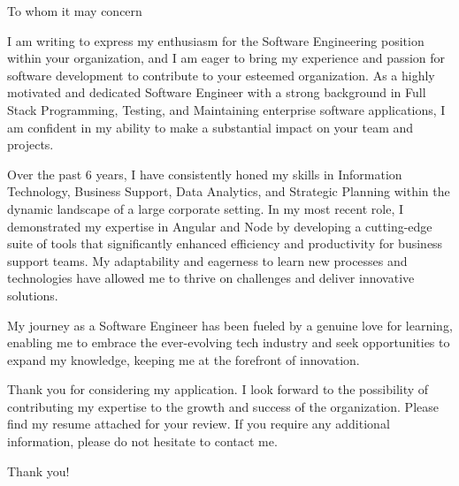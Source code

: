 \documentclass[
parskip=half,
fontsize=11pt, %
twoside=off, %
version=last,
foldmarks=false,
fromalign=center, %
fromrule=true,
frommobilephone,
fromemail,
subject=titled,
backaddress=false,
draft=true, %
firstfoot=false, %
final=false, %
]    
{scrlttr2}
\newcommand{\address}{
To whom it may concern    \\
}
\begin{document}
\begin{letter}{\address}
	\opening{}

I am writing to express my enthusiasm for the Software Engineering position within your organization,
and I am eager to bring my experience and passion for software development to contribute to your esteemed organization. 
As a highly motivated and dedicated Software Engineer with a strong background in Full Stack Programming, Testing, and Maintaining
enterprise software applications, I am confident in my ability to make a substantial impact on your team and projects.

Over the past 6 years, I have consistently honed my skills in Information Technology, Business Support, Data Analytics, and Strategic Planning 
within the dynamic landscape of a large corporate setting. In my most recent role, I demonstrated my expertise in Angular and Node by 
developing a cutting-edge suite of tools that significantly enhanced efficiency and productivity for business support teams. 
My adaptability and eagerness to learn new processes and technologies have allowed me to thrive on challenges and deliver innovative solutions.

My journey as a Software Engineer has been fueled by a genuine love for learning, enabling me to embrace the ever-evolving tech industry
and seek opportunities to expand my knowledge, keeping me at the forefront of innovation.

Thank you for considering my application. I look forward to the possibility of contributing my expertise to the growth and success of the organization. 
Please find my resume attached for your review. If you require any additional information, please do not hesitate to contact me.
	
\closing{Thank you!}


\end{letter}
\end{document}
